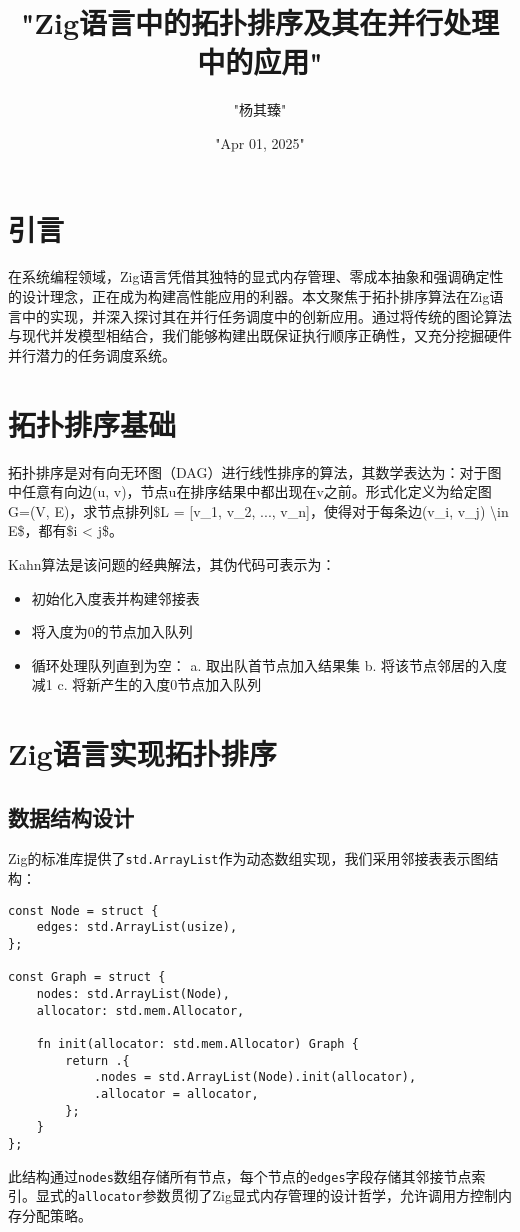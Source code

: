 \title{"Zig语言中的拓扑排序及其在并行处理中的应用"}
\author{"杨其臻"}
\date{"Apr 01, 2025"}
\maketitle
\chapter{引言}
在系统编程领域，Zig语言凭借其独特的显式内存管理、零成本抽象和强调确定性的设计理念，正在成为构建高性能应用的利器。本文聚焦于拓扑排序算法在Zig语言中的实现，并深入探讨其在并行任务调度中的创新应用。通过将传统的图论算法与现代并发模型相结合，我们能够构建出既保证执行顺序正确性，又充分挖掘硬件并行潜力的任务调度系统。\par
\chapter{拓扑排序基础}
拓扑排序是对有向无环图（DAG）进行线性排序的算法，其数学表达为：对于图中任意有向边(u, v)，节点u在排序结果中都出现在v之前。形式化定义为给定图G=(V, E)，求节点排列\${}L = [v\_{}1, v\_{}2, ..., v\_{}n]$，使得对于每条边$(v\_{}i, v\_{}j) \textbackslash{}in E\${}，都有\${}i < j\${}。\par
Kahn算法是该问题的经典解法，其伪代码可表示为：\par
\begin{itemize}
\item 初始化入度表并构建邻接表
\item 将入度为0的节点加入队列
\item 循环处理队列直到为空：
a. 取出队首节点加入结果集
b. 将该节点邻居的入度减1
c. 将新产生的入度0节点加入队列
\end{itemize}
\chapter{Zig语言实现拓扑排序}
\section{数据结构设计}
Zig的标准库提供了\verb!std.ArrayList!作为动态数组实现，我们采用邻接表表示图结构：\par
\begin{lstlisting}[language=zig]
const Node = struct {
    edges: std.ArrayList(usize),
};

const Graph = struct {
    nodes: std.ArrayList(Node),
    allocator: std.mem.Allocator,

    fn init(allocator: std.mem.Allocator) Graph {
        return .{
            .nodes = std.ArrayList(Node).init(allocator),
            .allocator = allocator,
        };
    }
};
\end{lstlisting}
此结构通过\verb!nodes!数组存储所有节点，每个节点的\verb!edges!字段存储其邻接节点索引。显式的\verb!allocator!参数贯彻了Zig显式内存管理的设计哲学，允许调用方控制内存分配策略。\par
